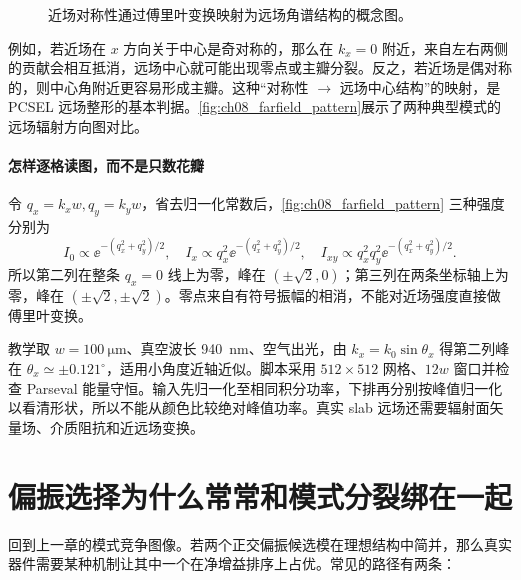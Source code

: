 \begin{figure}[htbp]
  \centering
  \caption{近场对称性通过傅里叶变换映射为远场角谱结构的概念图。}
  \label{fig:near-far-symmetry}
\end{figure}

例如，若近场在 $x$ 方向关于中心是奇对称的，那么在 $k_x=0$ 附近，来自左右两侧的贡献会相互抵消，远场中心就可能出现零点或主瓣分裂。反之，若近场是偶对称的，则中心角附近更容易形成主瓣。这种“对称性 $\rightarrow$ 远场中心结构”的映射，是 PCSEL 远场整形的基本判据。\cref{fig:ch08_farfield_pattern}展示了两种典型模式的远场辐射方向图对比。



\paragraph{怎样逐格读图，而不是只数花瓣}
令 $q_x=k_xw,q_y=k_yw$，省去归一化常数后，\cref{fig:ch08_farfield_pattern} 三种强度分别为
\[
I_0\propto\ee^{-(q_x^2+q_y^2)/2},\quad
I_x\propto q_x^2\ee^{-(q_x^2+q_y^2)/2},\quad
I_{xy}\propto q_x^2q_y^2\ee^{-(q_x^2+q_y^2)/2}.
\]
所以第二列在整条 $q_x=0$ 线上为零，峰在 $(\pm\sqrt2,0)$；第三列在两条坐标轴上为零，峰在 $(\pm\sqrt2,\pm\sqrt2)$。零点来自有符号振幅的相消，不能对近场强度直接做傅里叶变换。

教学取 $w=\SI{100}{\micro\meter}$、真空波长 \SI{940}{nm}、空气出光，由 $k_x=k_0\sin\theta_x$ 得第二列峰在 $\theta_x\simeq\pm0.121^\circ$，适用小角度近轴近似。脚本采用 $512\times512$ 网格、$12w$ 窗口并检查 Parseval 能量守恒。输入先归一化至相同积分功率，下排再分别按峰值归一化以看清形状，所以不能从颜色比较绝对峰值功率。真实 slab 远场还需要辐射面矢量场、介质阻抗和近远场变换。

\section{偏振选择为什么常常和模式分裂绑在一起}
回到上一章的模式竞争图像。若两个正交偏振候选模在理想结构中简并，那么真实器件需要某种机制让其中一个在净增益排序上占优。常见的路径有两条：

